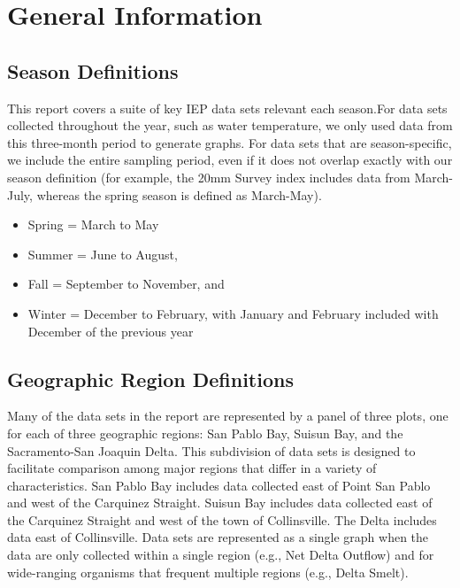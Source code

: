 \documentclass[
]{book}
\providecommand{\tightlist}{%
  \setlength{\itemsep}{0pt}\setlength{\parskip}{0pt}}
\begin{document}
\hypertarget{general-information}{%
\section{General Information}\label{general-information}}

\hypertarget{season-definitions}{%
\subsection{Season Definitions}\label{season-definitions}}

This report covers a suite of key IEP data sets relevant each season.For data sets collected throughout the year, such as water temperature, we only used data from this three-month period to generate graphs. For data sets that are season-specific, we include the entire sampling period, even if it does not overlap exactly with our season definition (for example, the 20mm Survey index includes data from March-July, whereas the spring season is defined as March-May).

\begin{itemize}
\tightlist
\item
  Spring = March to May
\item
  Summer = June to August,
\item
  Fall = September to November, and\\
\item
  Winter = December to February, with January and February included with December of the previous year
\end{itemize}

\hypertarget{geographic-region-definitions}{%
\subsection{Geographic Region Definitions}\label{geographic-region-definitions}}

Many of the data sets in the report are represented by a panel of three plots, one for each of three geographic regions: San Pablo Bay, Suisun Bay, and the Sacramento-San Joaquin Delta. This subdivision of data sets is designed to facilitate comparison among major regions that differ in a variety of characteristics. San Pablo Bay includes data collected east of Point San Pablo and west of the Carquinez Straight. Suisun Bay includes data collected east of the Carquinez Straight and west of the town of Collinsville. The Delta includes data east of Collinsville. Data sets are represented as a single graph when the data are only collected within a single region (e.g., Net Delta Outflow) and for wide-ranging organisms that frequent multiple regions (e.g., Delta Smelt).
\end{document}
